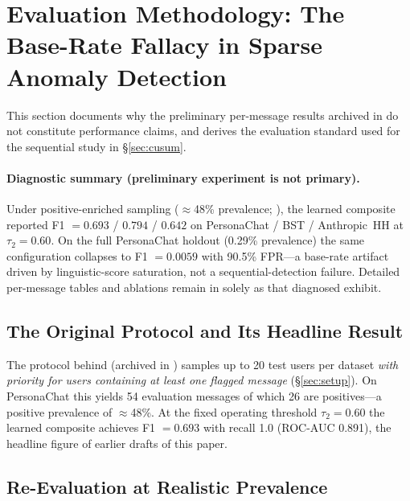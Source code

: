 \documentclass[conference]{IEEEtran}
\begin{document}
\section{Evaluation Methodology: The Base-Rate Fallacy in Sparse Anomaly Detection}
\label{sec:baserate}

This section documents why the preliminary per-message results archived in
 do not constitute performance claims, and derives the
evaluation standard used for the sequential study in \S\ref{sec:cusum}.

\paragraph{Diagnostic summary (preliminary experiment is not primary).}
Under positive-enriched sampling ($\approx$48\% prevalence; ), the
learned composite reported F1 $= 0.693$ / $0.794$ / $0.642$ on PersonaChat / BST /
Anthropic~HH at $\tau_2{=}0.60$.
On the full PersonaChat holdout (0.29\% prevalence) the same configuration collapses
to F1 $= 0.0059$ with 90.5\% FPR---a base-rate artifact driven by linguistic-score
saturation, not a sequential-detection failure.
Detailed per-message tables and ablations remain in  solely as
that diagnosed exhibit.

\subsection{The Original Protocol and Its Headline Result}
\label{sec:baserate:original}

The protocol behind  (archived in ) samples up to
20 test users per dataset
\emph{with priority for users containing at least one flagged message}
(\S\ref{sec:setup}).
On PersonaChat this yields 54 evaluation messages of which 26 are positives---a
positive prevalence of $\approx$48\%.
At the fixed operating threshold $\tau_2{=}0.60$ the learned composite achieves
F1 $= 0.693$ with recall 1.0 (ROC-AUC 0.891), the headline figure of earlier drafts
of this paper.

\subsection{Re-Evaluation at Realistic Prevalence}
\label{sec:baserate:holdout}
\end{document}
